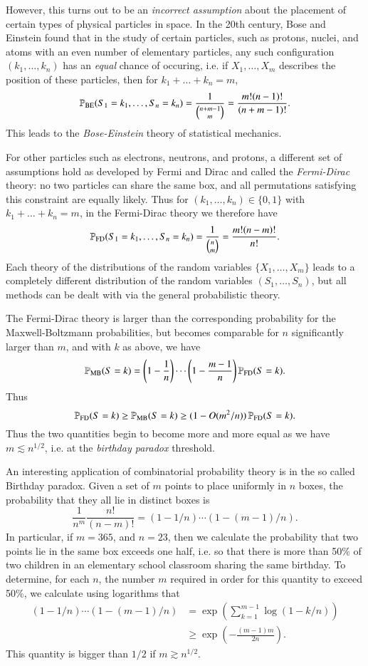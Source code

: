 However, this turns out to be an \emph{incorrect assumption} about the placement of certain types of physical particles in space. In the 20th century, Bose and Einstein found that in the study of certain particles, such as protons, nuclei, and atoms with an even number of elementary particles, any such configuration $(k_1, \dots, k_n)$ has an \emph{equal} chance of occuring, i.e. if $X_1,\dots,X_m$ describes the position of these particles, then for $k_1 + \dots + k_n = m$,
%
\[ \operatorname{\mathbb{P}}_{\text{BE}}(S_1 = k_1, \dots, S_n = k_n) = \frac{1}{{n+m-1 \choose m}} = \frac{m! (n-1)!}{(n+m-1)!}. \]
%
This leads to the \emph{Bose-Einstein} theory of statistical mechanics.

For other particles such as electrons, neutrons, and protons, a different set of assumptions hold as developed by Fermi and Dirac and called the \emph{Fermi-Dirac} theory: no two particles can share the same box, and all permutations satisfying this constraint are equally likely. Thus for $(k_1,\dots,k_n) \in \{ 0, 1 \}$ with $k_1 + \dots + k_n = m$, in the Fermi-Dirac theory we therefore have
%
\[ \operatorname{\mathbb{P}}_{\text{FD}}(S_1 = k_1, \dots, S_n = k_n) = \frac{1}{{n \choose m}} = \frac{m! (n-m)!}{n!}. \]
%
Each theory of the distributions of the random variables $\{ X_1,\dots, X_m \}$ leads to a completely different distribution of the random variables $(S_1,\dots,S_n)$, but all methods can be dealt with via the general probabilistic theory.

The Fermi-Dirac theory is larger than the corresponding probability for the Maxwell-Boltzmann probabilities, but becomes comparable for $n$ significantly larger than $m$, and with $k$ as above, we have
%
\[ \operatorname{\mathbb{P}}_{\text{MB}}(S = k) = \left(1 - \frac{1}{n} \right) \cdots \left(1 - \frac{m-1}{n} \right) \operatorname{\mathbb{P}}_{\text{FD}}(S = k). \]
%
Thus
%
\[ \operatorname{\mathbb{P}}_{\text{FD}}(S = k) \geq \operatorname{\mathbb{P}}_{\text{MB}}(S = k) \geq (1 - O(m^2 / n)) \operatorname{\mathbb{P}}_{\text{FD}}(S = k). \]
%
Thus the two quantities begin to become more and more equal as we have $m \lesssim n^{1/2}$, i.e. at the \emph{birthday paradox} threshold.

\begin{example}
    An interesting application of combinatorial probability theory is in the so called Birthday paradox. Given a set of $m$ points to place uniformly in $n$ boxes, the probability that they all lie in distinct boxes is
    \[ \frac{1}{n^m} \frac{n!}{(n-m)!} = (1-1/n) \cdots (1-(m-1)/n). \]
    In particular, if $m = 365$, and $n = 23$, then we calculate the probability that two points lie in the same box exceeds one half, i.e. so that there is more than 50\% of two children in an elementary school classroom sharing the same birthday. To determine, for each $n$, the number $m$ required in order for this quantity to exceed 50\%, we calculate using logarithms that
    \begin{align*}
        (1 - 1/n) \cdots (1 - (m-1)/n) &= \exp \left( \sum_{k = 1}^{m-1} \log(1-k/n) \right)\\
        &\geq \exp \left( - \frac{(m-1)m}{2n} \right).
    \end{align*}
    This quantity is bigger than $1/2$ if $m \gtrsim n^{1/2}$.
\end{example}

